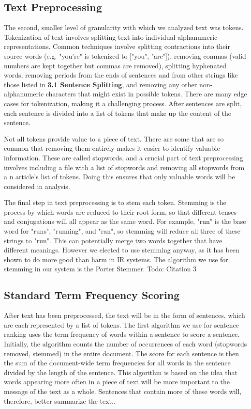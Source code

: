 \documentclass[11pt,a4paper]{article}
\begin{document}
  \subsection{Text Preprocessing}

  The second, smaller level of granularity with which we analyzed text was tokens. Tokenization of text involves splitting text into individual alphanumeric representations. Common techniques involve splitting contractions into their source words (e.g. "you're" is tokenized to ["you", "are"]), removing commas (valid numbers are kept together but commas are removed), splitting hyphenated words, removing periods from the ends of sentences and from other strings like those listed in \textbf{3.1 Sentence Splitting}, and removing any other non-alphanumeric characters that might exist in possible tokens. There are many edge cases for tokenization, making it a challenging process. After sentences are split, each sentence is divided into a list of tokens that make up the content of the sentence. \cite{KJU:10}

  Not all tokens provide value to a piece of text. There are some that are so common that removing them entirely makes it easier to identify valuable information. These are called stopwords, and a crucial part of text preprocessing involves including a file with a list of stopwords and removing all stopwords from a n article's list of tokens. Doing this ensures that only valuable words will be considered in analysis. \cite{ICETET:01}

  The final step in text preprocessing is to stem each token. Stemming is the process by which words are reduced to their root form, so that different tenses and conjugations will all appear as the same word. For example, "run" is the base word for "runs", "running", and "ran", so stemming will reduce all three of these strings to "run". This can potentially merge two words together that have different meanings. However we elected to use stemming anyway, as it has been shown to do more good than harm in IR systems. The algorithm we use for stemming in our system is the Porter Stemmer. Todo: Citation 3

  \subsection{Standard Term Frequency Scoring}

  After text has been preprocessed, the text will be in the form of sentences, which are each represented by a list of tokens. The first algorithm we use for sentence ranking uses the term frequency of words within a sentence to score a sentence. Initially, the algorithm counts the number of occurrences of each word (stopwords removed, stemmed) in the entire document. The score for each sentence is then the sum of the document-wide term frequencies for all words in the sentence divided by the length of the sentence. This algorithm is based on the idea that words appearing more often in a piece of text will be more important to the message of the text as a whole. Sentences that contain more of these words will, therefore, better summarize the text..
\end{document}
